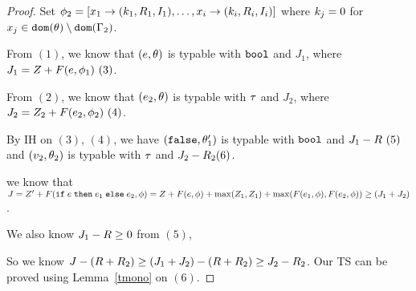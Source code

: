 \begin{proof}
   Set $\phi_2 = [x_1 \to (k_1, R_1, I_1) , \ldots, x_i \to (k_i, R_i, I_i)]$ where $k_j = 0 $ for $x_j \in \mathtt{dom}(\theta) \setminus \mathtt{dom}(\Gamma_2) $.
  
   From $(1)$, we know that $(e, \theta )$ is typable with $\mathtt{bool}$ and $J_1$, where $J_1 = Z + F(e, \phi_1 )~(3)$.

    From $(2)$, we know that $(e_2, \theta )$ is typable with $\tau$ and $J_2$, where $J_2 = Z_2 + F(e_2, \phi_2 )~(4)$.

    By IH on $(3)$, $(4)$, we have $(\mathtt{false}, \theta_1')$ is typable with $\mathtt{bool}$ and $J_1 - R~(5)$ and $(v_2, \theta_2)$ is typable with $\tau$ and $J_2 - R_2(6)$.

    we know that $ J = Z' +  F(\mathtt{if} \; e \;\mathtt{then} \; e_1 \;\mathtt{else} \; e_2, \phi )  = Z + F(e, \phi) + \max(Z_1, Z_1) + \max(F(e_1, \phi) , F(e_2, \phi) )  \geq (J_1 + J_2) $.

     We also know $J_1 -R \geq 0$ from $(5)$, 

    So we know $ J - (R + R_2) \geq (J_1 + J_2) - (R+R_2) \geq J_2 - R_2 $.  Our TS can be proved using Lemma~\ref{tmono} on $(6)$.
  
    
   \end{proof}  